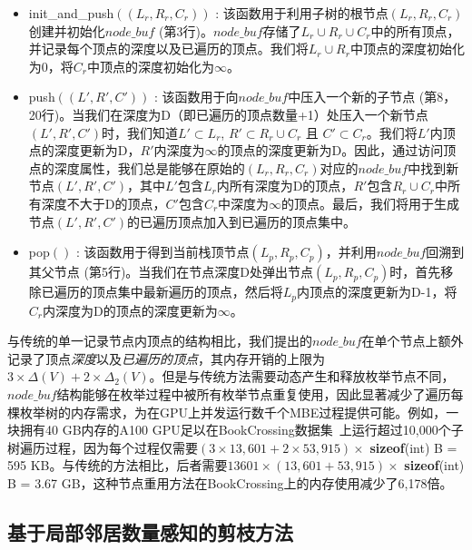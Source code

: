 \begin{itemize}
  \item  \textsf{init\_and\_push}$((L_r,R_r,C_r))$ : 该函数用于利用子树的根节点$(L_r,R_r,C_r)$创建并初始化$node\_buf$ (第3行)。$node\_buf$存储了$L_r \cup R_r \cup C_r$中的所有顶点，并记录每个顶点的深度以及已遍历的顶点。我们将$L_r \cup R_r$中顶点的深度初始化为0，将$C_r$中顶点的深度初始化为$\infty$。
  
  \item  \textsf{push}$((L',R',C'))$ : 该函数用于向$node\_buf$中压入一个新的子节点 (第8，20行)。当我们在深度为D（即已遍历的顶点数量+1）处压入一个新节点$(L',R',C')$时，我们知道$L' \subset L_r$, $R' \subset R_r \cup C_r$ 且 $C' \subset C_r$。我们将$L'$内顶点的深度更新为D，$R'$内深度为$\infty$的顶点的深度更新为D。因此，通过访问顶点的深度属性，我们总是能够在原始的$(L_r,R_r,C_r)$对应的$node\_buf$中找到新节点$(L',R',C')$，其中$L'$包含$L_r$内所有深度为D的顶点，$R'$包含$R_r\cup C_r$中所有深度不大于D的顶点，$C'$包含$C_r$中深度为$\infty$的顶点。最后，我们将用于生成节点$(L',R',C')$的已遍历顶点加入到已遍历的顶点集中。

  \item  \textsf{pop}$()$ : 该函数用于得到当前栈顶节点$(L_p,R_p,C_p)$，并利用$node\_buf$回溯到其父节点 (第5行)。当我们在节点深度D处弹出节点$(L_p,R_p,C_p)$时，首先移除已遍历的顶点集中最新遍历的顶点，然后将$L_p$内顶点的深度更新为D-1，将$C_r$内深度为D的顶点的深度更新为$\infty$。
  
\end{itemize}




与传统的单一记录节点内顶点的结构相比，我们提出的$node\_buf$在单个节点上额外记录了顶点\textit{深度}以及\textit{已遍历的顶点}，其内存开销的上限为$3 \times \Delta(V) + 2 \times \Delta_2(V)$。但是与传统方法需要动态产生和释放枚举节点不同，$node\_buf$结构能够在枚举过程中被所有枚举节点重复使用，因此显著减少了遍历每棵枚举树的内存需求，为在GPU上并发运行数千个MBE过程提供可能。例如，一块拥有40 GB内存的A100 GPU足以在BookCrossing数据集~\cite{konect}上运行超过10,000个子树遍历过程，因为每个过程仅需要$(3 \times 13,601 + 2 \times 53,915) \times$ \textbf{sizeof}(int) B = 595 KB。与传统的方法相比，后者需要$13601 \times (13,601 + 53,915)\times$ \textbf{sizeof}(int) B = 3.67 GB，这种节点重用方法在BookCrossing上的内存使用减少了6,178倍。

\subsection{基于局部邻居数量感知的剪枝方法}

